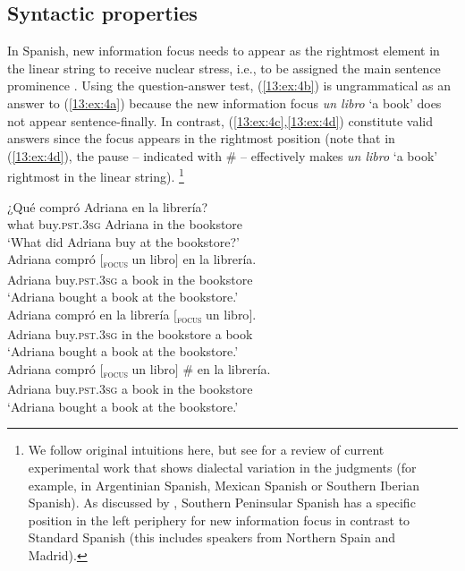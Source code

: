 \documentclass[output=paper,colorlinks,citecolor=brown,draftmode]{langscibook}
\begin{document}
\subsection{Syntactic properties}
In Spanish, new information focus needs to appear as the rightmost element in the linear string to receive nuclear stress, i.e., to be assigned the main sentence prominence \citep{Zubizarreta1998,Gutiérrez-Bravo2008,López2009}. Using the question-answer test, (\ref{13:ex:4b}) is ungrammatical as an answer to (\ref{13:ex:4a}) because the new information focus \textit{un libro} ‘a book’ does not appear sentence-finally. In contrast, (\ref{13:ex:4c},\ref{13:ex:4d}) constitute valid answers since the focus appears in the rightmost position (note that in (\ref{13:ex:4d}), the pause -- indicated with \# -- effectively makes \textit{un libro} ‘a book’ rightmost in the linear string). \footnote{We follow  original intuitions here, but see \citet{ortegasantos2016} for a review of current experimental work that shows dialectal variation in the judgments (for example, in Argentinian Spanish, Mexican Spanish or Southern Iberian Spanish). As discussed by \citet{Jiménez-Fernández2015a}, Southern Peninsular Spanish has a specific position in the left periphery for new information focus in contrast to Standard Spanish (this includes speakers from Northern Spain and Madrid).}

\ea \label{13:ex:4}%
\ea   \label{13:ex:4a}
\gll ¿Qué compró Adriana en la librería?\\
what buy.\textsc{pst}.3\textsc{sg}  Adriana in the bookstore\\
\glt ‘What did Adriana buy at the bookstore?’\\

\ex \gll * Adriana compró $[$\textsubscript{\textsc{focus}} un libro$]$ en la librería. \\ \label{13:ex:4b}
{}Adriana buy.\textsc{pst}.3\textsc{sg} {} a   book in the bookstore\\
\glt ‘Adriana bought a book at the bookstore.’  \\

\ex   \label{13:ex:4c}
\gll Adriana compró en la librería   $[$\textsubscript{\textsc{focus}} un libro$]$.\\
Adriana  buy.\textsc{pst}.3\textsc{sg} in the bookstore {} a book\\
\glt ‘Adriana bought a book at the bookstore.’  \\

\ex  \label{13:ex:4d}
\gll Adriana compró         $[$\textsubscript{\textsc{focus}} un libro$]$ \# en la librería.\\
Adriana  buy.\textsc{pst}.3\textsc{sg} {} a  book {} in the bookstore\\
\glt ‘Adriana bought a book at the bookstore.’  \\
\z
\z
\end{document}
